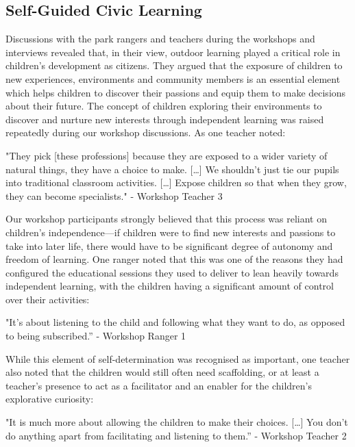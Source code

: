 \subsection{Self-Guided Civic Learning}

Discussions with the park rangers and teachers during the workshops and interviews revealed that, in their view, outdoor learning played a critical role in children’s development as citizens. They argued that the exposure of children to new experiences, environments and community members is an essential element which helps children to discover their passions and equip them to make decisions about their future. The concept of children exploring their environments to discover and nurture new interests through independent learning was raised repeatedly during our workshop discussions. As one teacher noted:

\begin{displayquote}
"They pick [these professions] because they are exposed to a wider variety of natural things, they have a choice to make. […] We shouldn’t just tie our pupils into traditional classroom activities. […] Expose children so that when they grow, they can become specialists." - Workshop Teacher 3
\end{displayquote}

Our workshop participants strongly believed that this process was reliant on children’s independence---if children were to find new interests and passions to take into later life, there would have to be significant degree of autonomy and freedom of learning. One ranger noted that this was one of the reasons they had configured the educational sessions they used to deliver to lean heavily towards independent learning, with the children having a significant amount of control over their activities:

\begin{displayquote}
"It's about listening to the child and following what they want to do, as opposed to being subscribed.” - Workshop Ranger 1
\end{displayquote}

While this element of self-determination was recognised as important, one teacher also noted that the children would still often need scaffolding, or at least a teacher’s presence to act as a facilitator and an enabler for the children’s explorative curiosity:

\begin{displayquote}
"It is much more about allowing the children to make their choices. […] You don’t do anything apart from facilitating and listening to them.” - Workshop Teacher 2
\end{displayquote}

